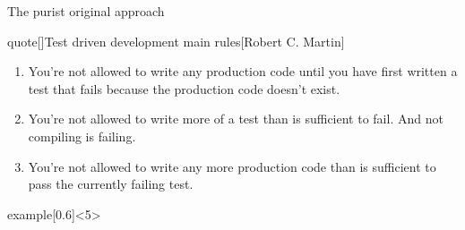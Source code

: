 \begin{frame}{The purist original approach}
    \begin{varblock}{quote}[\textwidth]{Test driven development main rules}[Robert C. Martin]
        \begin{enumerate}[<+(1)->]
            \item You're not allowed to write any production code until you have first written a test that fails because the production code doesn't exist.
            \item You're not allowed to write more of a test than is sufficient to fail.
            And not compiling is failing.
            \item You're not allowed to write any more production code than is sufficient to pass the currently failing test.
        \end{enumerate}
    \end{varblock}
    \begin{varblock}{example}[0.6\textwidth]{}<5>
    \end{varblock}
\end{frame}
